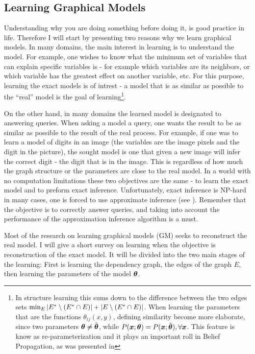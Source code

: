 \subsection{Learning Graphical Models}
\label{sec:learning}
Understanding why you are doing something before doing it, is good practice in life. 
Therefore I will start by presenting two reasons why we learn graphical models.
In many domains, the main interest in learning is to understand the model.
For example, one wishes to know what the minimum set of variables that can explain specific variables is - for example which variables are its neighbors, or which variable has the greatest effect on another variable, etc.
For this purpose, learning the exact models is of intrest - a model that is as similar as possible to the ``real'' model is the goal of learning\footnote{
In structure learning this sums down to the difference between the two edges sets $ \min_{E} |{E}^{*}\setminus ({E}^{*} \cap E)| + |E \setminus ({E}^{*} \cap E)|$.
When learning the parameters that are the functions $\theta_{ij}(x,y)$, defining similarity become more elaborate, since two parameters $\boldsymbol{\theta} \neq \tilde{\boldsymbol{\theta}}$, while $P(\boldsymbol{x}; \boldsymbol{\theta}) = P(\boldsymbol{x}; \tilde{\boldsymbol{\theta}}), \forall \boldsymbol{x}$.
This feature is know as re-parameterization and it plays an important roll in Belief Propagation, as was presented in }.

On the other hand, in many domains the learned model is designated to answering queries.
When asking a model a query, one wants the result to be as similar as possible to the result of the real process.
For example, if one was to learn a model of digits in an image (the variables are the image pixels and the digit in the picture),
the sought model is one that given a new image will infer the correct digit - the digit that is in the image.
This is regardless of how much the graph structure or the parameters are close to the real model.
In a world with no computation limitations these two objectives are the same - to learn the exact model and to preform exact inference.
Unfortunately, exact inference is NP-hard in many cases, one is forced to use approximate inference (see ).
Remember that the objective is to correctly answer queries, and taking into account the performance of the approximation inference algorithm is a must.

Most of the research on learning graphical models (GM) seeks to reconstruct the real model.
I will give a short survey on learning when the objective is reconstruction of the exact model.
It will be divided into the two main stages of the learning:
First is learning the dependency graph, the edges of the graph $E$,
then learning the parameters of the model $\boldsymbol{\theta}$.
